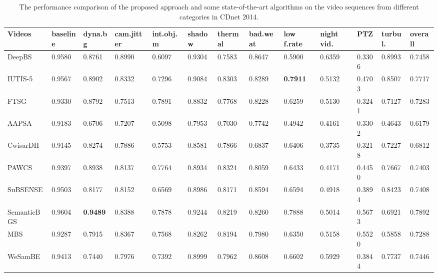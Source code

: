 \documentclass[journal]{IEEEtran}
\begin{document}
\begin{table}[!t]				%
\centering
\caption{The performance comparison of the proposed approach and some state-of-the-art algorithms on the video sequences from different categories in CDnet 2014.}
\label{tab1}
\begin{tabular}{lllllllllllll}
\hline
Videos      & baseline & dyna.bg & cam.jitter & int.obj.m & shadow & thermal & bad.weat & low f.rate & night vid. & PTZ    & turbul. & overall \\ \hline
DeepBS\cite{Babaee2017deep}      & 0.9580   & 0.8761  & 0.8990     & 0.6097    & 0.9304 & 0.7583  & 0.8647   & 0.5900     & 0.6359     & 0.3306 & 0.8993  & 0.7458  \\
IUTIS-5\cite{Bianco2017TEC}     & 0.9567   & 0.8902  & 0.8332     & 0.7296    & 0.9084 & 0.8303  & 0.8289   & \textbf{0.7911}     & 0.5132     & 0.4703 & 0.8507  & 0.7717  \\
FTSG\cite{Wang2014FTSG}        & 0.9330   & 0.8792  & 0.7513     & 0.7891    & 0.8832 & 0.7768  & 0.8228   & 0.6259     & 0.5130     & 0.3241 & 0.7127  & 0.7283  \\
AAPSA\cite{RAMIREZALONSO2016990}       & 0.9183   & 0.6706  & 0.7207     & 0.5098    & 0.7953 & 0.7030  & 0.7742   & 0.4942     & 0.4161     & 0.3302 & 0.4643  & 0.6179  \\
CwisarDH\cite{Gregorio2014CwisarDH}    & 0.9145   & 0.8274  & 0.7886     & 0.5753    & 0.8581 & 0.7866  & 0.6837   & 0.6406     & 0.3735     & 0.3218 & 0.7227  & 0.6812  \\
PAWCS\cite{Charles2015PAWCS}       & 0.9397   & 0.8938  & 0.8137     & 0.7764    & 0.8934 & 0.8324  & 0.8059   & 0.6433     & 0.4171     & 0.4450 & 0.7667  & 0.7403  \\
SuBSENSE\cite{St-Charles2015SuBSENSE}    & 0.9503   & 0.8177  & 0.8152     & 0.6569    & 0.8986 & 0.8171  & 0.8594   & 0.6594     & 0.4918     & 0.3894 & 0.8423  & 0.7408  \\
SemanticBGS\cite{Braham2017Semantic} & 0.9604   & \textbf{0.9489}  & 0.8388     & 0.7878    & 0.9244 & 0.8219  & 0.8260   & 0.7888     & 0.5014     & 0.5673 & 0.6921  & 0.7892  \\
MBS\cite{Multimode_Background_Subtraction}         & 0.9287   & 0.7915  & 0.8367     & 0.7568    & 0.8262 & 0.8194  & 0.7980   & 0.6350     & 0.5158     & 0.5520 & 0.5858  & 0.7288  \\
WeSamBE\cite{2017_TCSVT_BG_7938679}     & 0.9413   & 0.7440  & 0.7976     & 0.7392    & 0.8999 & 0.7962  & 0.8608   & 0.6602     & 0.5929     & 0.3844 & 0.7737  & 0.7446  \\

\end{tabular}
\end{table}
\end{document}
